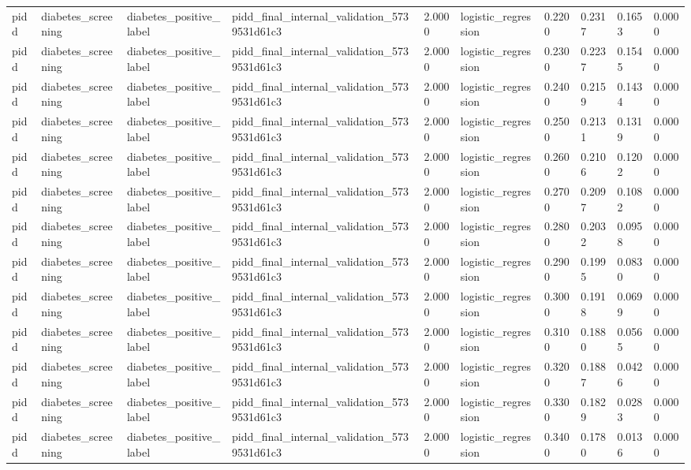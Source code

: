 \begin{tabular}{llllllllll}
pidd & diabetes\_screening & diabetes\_positive\_label & pidd\_final\_internal\_validation\_5739531d61c3 & 2.0000 & logistic\_regression & 0.2200 & 0.2317 & 0.1653 & 0.0000 \\
pidd & diabetes\_screening & diabetes\_positive\_label & pidd\_final\_internal\_validation\_5739531d61c3 & 2.0000 & logistic\_regression & 0.2300 & 0.2237 & 0.1545 & 0.0000 \\
pidd & diabetes\_screening & diabetes\_positive\_label & pidd\_final\_internal\_validation\_5739531d61c3 & 2.0000 & logistic\_regression & 0.2400 & 0.2159 & 0.1434 & 0.0000 \\
pidd & diabetes\_screening & diabetes\_positive\_label & pidd\_final\_internal\_validation\_5739531d61c3 & 2.0000 & logistic\_regression & 0.2500 & 0.2131 & 0.1319 & 0.0000 \\
pidd & diabetes\_screening & diabetes\_positive\_label & pidd\_final\_internal\_validation\_5739531d61c3 & 2.0000 & logistic\_regression & 0.2600 & 0.2106 & 0.1202 & 0.0000 \\
pidd & diabetes\_screening & diabetes\_positive\_label & pidd\_final\_internal\_validation\_5739531d61c3 & 2.0000 & logistic\_regression & 0.2700 & 0.2097 & 0.1082 & 0.0000 \\
pidd & diabetes\_screening & diabetes\_positive\_label & pidd\_final\_internal\_validation\_5739531d61c3 & 2.0000 & logistic\_regression & 0.2800 & 0.2032 & 0.0958 & 0.0000 \\
pidd & diabetes\_screening & diabetes\_positive\_label & pidd\_final\_internal\_validation\_5739531d61c3 & 2.0000 & logistic\_regression & 0.2900 & 0.1995 & 0.0830 & 0.0000 \\
pidd & diabetes\_screening & diabetes\_positive\_label & pidd\_final\_internal\_validation\_5739531d61c3 & 2.0000 & logistic\_regression & 0.3000 & 0.1918 & 0.0699 & 0.0000 \\
pidd & diabetes\_screening & diabetes\_positive\_label & pidd\_final\_internal\_validation\_5739531d61c3 & 2.0000 & logistic\_regression & 0.3100 & 0.1880 & 0.0565 & 0.0000 \\
pidd & diabetes\_screening & diabetes\_positive\_label & pidd\_final\_internal\_validation\_5739531d61c3 & 2.0000 & logistic\_regression & 0.3200 & 0.1887 & 0.0426 & 0.0000 \\
pidd & diabetes\_screening & diabetes\_positive\_label & pidd\_final\_internal\_validation\_5739531d61c3 & 2.0000 & logistic\_regression & 0.3300 & 0.1829 & 0.0283 & 0.0000 \\
pidd & diabetes\_screening & diabetes\_positive\_label & pidd\_final\_internal\_validation\_5739531d61c3 & 2.0000 & logistic\_regression & 0.3400 & 0.1780 & 0.0136 & 0.0000 \\

\end{tabular}
